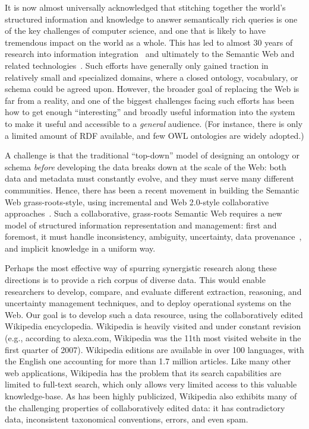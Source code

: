 \documentclass{llncs}
\begin{document}
It is now almost universally acknowledged that stitching together the
world's structured information and knowledge to answer semantically
rich queries is one of the key challenges of computer science, and one
that is likely to have tremendous impact on the world as a whole.
This has led to almost 30 years of research into information
integration~\cite{multibase,DBLP:conf/sigmod/Wiederhold93} and
ultimately to the Semantic Web and related
technologies~\cite{p2p-mediation,hyperion,chatty-web}.  Such efforts
have generally only gained traction in relatively small and
specialized domains, where a closed ontology, vocabulary, or schema
could be agreed upon.  However, the broader goal of replacing the Web
is far from a reality, and one of the biggest challenges facing such
efforts has been how to get enough ``interesting'' and broadly useful
information into the system to make it useful and accessible to a
\emph{general} audience.  (For instance, there is only a limited
amount of RDF available, and few OWL ontologies are widely adopted.)

A challenge is that the traditional ``top-down'' model of designing an
ontology or schema \emph{before} developing the data breaks down at
the scale of the Web: both data and metadata must constantly evolve,
and they must serve many different communities.  Hence, there has been
a recent movement in building the Semantic Web grass-roots-style,
using incremental and Web 2.0-style collaborative
approaches~\cite{cidr-chasm,hyperion,orchestra-cidr,DBLP:journals/debu/DoanRCDLMSS06}.
Such a collaborative, grass-roots Semantic Web requires a new model of
structured information representation and management: first and
foremost, it must handle inconsistency, ambiguity, uncertainty, data
provenance~\cite{cui-thesis,DBLP:conf/icdt/BunemanKT01,DBLP:conf/vldb/BenjellounSHW06},
and implicit knowledge in a uniform way.

Perhaps the most effective way of spurring synergistic research along
these directions is to provide a rich corpus of diverse data.  This
would enable researchers to develop, compare, and evaluate different
extraction, reasoning, and uncertainty management techniques, and to
deploy operational systems on the Web.  Our goal is to develop such a
data resource, using the collaboratively edited Wikipedia
encyclopedia.  Wikipedia is heavily visited and under constant revision
(e.g., according to alexa.com, Wikipedia was the 11th most visited
website in the first quarter of 2007).  Wikipedia editions are
available in over 100 languages, with the English one accounting for
more than 1.7 million articles.  Like many other web applications,
Wikipedia has the problem that its search capabilities are limited to
full-text search, which only allows very limited access to this
valuable knowledge-base.  As has been highly publicized, Wikipedia
also exhibits many of the challenging properties of collaboratively
edited data: it has contradictory data, inconsistent taxonomical
conventions, errors, and even spam.
\end{document}
